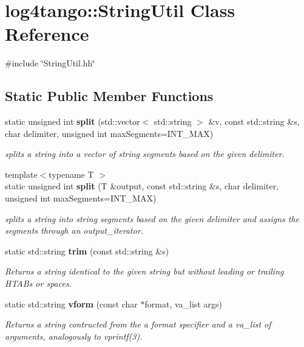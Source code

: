 \section{log4tango\-:\-:String\-Util Class Reference}
\label{classlog4tango_1_1StringUtil}


{\ttfamily \#include \char`\"{}String\-Util.\-hh\char`\"{}}

\subsection*{Static Public Member Functions}
\begin{DoxyCompactItemize}
\item 
static unsigned int {\bf split} (std\-::vector$<$ std\-::string $>$ \&v, const std\-::string \&s, char delimiter, unsigned int max\-Segments=I\-N\-T\-\_\-\-M\-A\-X)
\begin{DoxyCompactList}\small\item\em splits a string into a vector of string segments based on the given delimiter. \end{DoxyCompactList}\item 
{\footnotesize template$<$typename T $>$ }\\static unsigned int {\bf split} (T \&output, const std\-::string \&s, char delimiter, unsigned int max\-Segments=I\-N\-T\-\_\-\-M\-A\-X)
\begin{DoxyCompactList}\small\item\em splits a string into string segments based on the given delimiter and assigns the segments through an output\-\_\-iterator. \end{DoxyCompactList}\item 
static std\-::string {\bf trim} (const std\-::string \&s)
\begin{DoxyCompactList}\small\item\em Returns a string identical to the given string but without leading or trailing H\-T\-A\-Bs or spaces. \end{DoxyCompactList}\item 
static std\-::string {\bf vform} (const char $\ast$format, va\-\_\-list args)
\begin{DoxyCompactList}\small\item\em Returns a string contructed from the a format specifier and a va\-\_\-list of arguments, analogously to vprintf(3). \end{DoxyCompactList}\end{DoxyCompactItemize}


